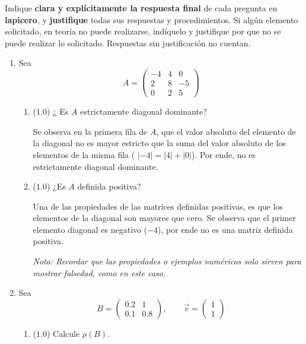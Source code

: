 \documentclass[12pt]{article}
\begin{document}
Indique \textbf{clara y explícitamente la respuesta final} de cada pregunta en \textbf{lapicero}, y \textbf{justifique} todas sus respuestas y procedimientos. Si algún elemento solicitado, en teoría no puede realizarse, indíquelo y justifique por que no se puede realizar lo solicitado. Respuestas sin justificación no cuentan.
  

  \begin{enumerate}[leftmargin=*,widest=9]
    \item Sea
    \[
    A = \begin{pmatrix}
    -4 & 4 & 0\\ 2 & 8 & -5\\ 0 & 2 & 5
    \end{pmatrix}
    \]     
    
    \begin{enumerate}[label=\alph*]
    \item (\(1.0\)) ¿ Es \(A\) estrictamente diagonal dominante?
    
    Se observa en la primera fila de \(A\), que el valor absoluto del elemento de la diagonal no es mayor estricto que la suma del valor absoluto de los elementos de la misma fila ( \(|-4| = |4|+|0|\)). Por ende, no es estrictamente diagonal dominante.

    \item (\(1.0\)) ¿Es \(A\) definida positiva?
    
Una de las propiedades de las matrices definidas positivas, es que los elementos de la diagonal son mayores que cero. Se observa que el primer elemento diagonal es negativo (\(-4\)), por ende no es una matriz definida positiva.

\textit{Nota: Recordar que las propiedades o ejemplos numéricos solo sirven para mostrar falsedad, como en este caso.}

    \end{enumerate}

    \item Sea
    \[
    B = \begin{pmatrix}
    0.2 & 1 \\ 0.1 & 0.8
    \end{pmatrix}, \qquad \vec{v} = \begin{pmatrix}
    1 \\ 1
    \end{pmatrix}
    \] 
    
    \begin{enumerate}[label=\alph*]
    \item (\(1.0\)) Calcule \(\rho (B)\).
    

\end{enumerate}
\end{enumerate}
\end{document}

